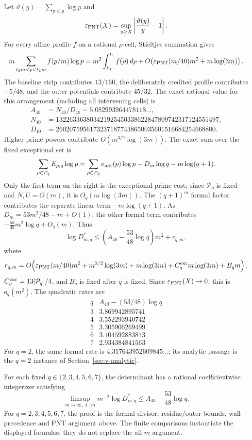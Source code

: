 Let \(\vartheta(y)=\sum_{p\le y}\log p\) and
\[
 \varepsilon_{\rm PNT}(X)=\sup_{y\ge X}\left|\frac{\vartheta(y)}y-1\right|.
\]
For every affine profile \(f\) on a rational \(\rho\)-cell,
Stieltjes summation gives
\[
 m\sum_{t_0m<p<t_1m}f(p/m)\log p
 =m^2\int_{t_0}^{t_1}f(\rho)\,d\rho
 +O\!\left(\varepsilon_{\rm PNT}(m/40)m^2+m\log(3m)\right).
\]
The baseline strip contributes \(13/160\), the deliberately credited profile
contributes \(-5/48\), and the outer potentials contribute \(45/32\).  The
exact rational value for this arrangement (including all intervening cells) is
\[
 \begin{aligned}
 A_{40}&=N_{40}/D_{40}=5.082993964478118\ldots,\\
 N_{40}&=132263363803421925450338622847809742317124551497,\\
 D_{40}&=26020759561732371877438650035601516684254668800.
 \end{aligned}
\]
Higher prime powers contribute \(O(m^{3/2}\log(3m))\).  The exact sum over
the fixed exceptional set is
\[
 \sum_{p\in\mathcal P_q}E_{p,q}\log p
 =\sum_{p\in\mathcal P_q}e_{\rm nat}(p)\log p-D_m\log q-m\log(q+1).
\]
Only the first term on the right is the exceptional-prime cost; since
\(\mathcal P_q\) is fixed and \(N,U=O(m)\), it is \(O_q(m\log(3m))\).  The
\((q+1)^m\) formal factor contributes the separate linear term
\(-m\log(q+1)\).  As
\(D_m=53m^2/48-m+O(1)\), the other formal term contributes
\(-\frac{53}{48}m^2\log q+O_q(m)\).  Thus
\[
 \log D^*_{m,q}\le
 \left(A_{40}-\frac{53}{48}\log q\right)m^2+r_{q,m},
\]
where
\[
 r_{q,m}=O\!\left(\varepsilon_{\rm PNT}(m/40)m^2
 +m^{3/2}\log(3m)+m\log(3m)+C_q^{\rm exc}m\log(3m)+B_qm\right),
\]
\(C_q^{\rm exc}=13|\mathcal P_q|/4\), and \(B_q\) is fixed after \(q\) is fixed.  Since
\(\varepsilon_{\rm PNT}(X)\to0\), this is \(o_q(m^2)\).  The quadratic rates are
\[
\begin{array}{c|c}
q&A_{40}-(53/48)\log q\\\hline
3&3.869942895741\\
4&3.552293940742\\
5&3.305906269499\\
6&3.104592883873\\
7&2.934384841563
\end{array}
\]
For \(q=2\), the same formal rate is
\(4.317643952609845\ldots\); its analytic passage is the \(q=2\) instance of
Section~\ref{sec:v-analytic}.

\begin{proposition}
\label{prop:v-fixed-arithmetic}
For each fixed \(q\in\{2,3,4,5,6,7\}\), the determinant has a rational
coefficientwise integerizer satisfying
\[
 \limsup_{m\to\infty,\ 4\mid m}m^{-2}\log D^*_{m,q}
 \le A_{40}-\frac{53}{48}\log q.
\]
For \(q=2,3,4,5,6,7\), the proof is the formal divisor, residue/outer bounds,
wall precedence and PNT argument above.  The finite comparisons instantiate
the displayed formulas; they do not replace the all-$m$ argument.
\end{proposition}
